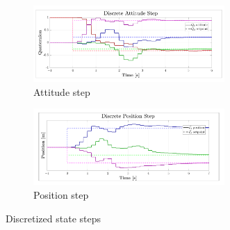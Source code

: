 \begin{figure}[hbtp]
\centering
\begin{subfigure}{\textwidth}
\centering
\includegraphics[width=0.8\textwidth]{graphs/discrete_attitude_step}
\vspace{-12pt}
\caption{Attitude step}
\end{subfigure}
\begin{subfigure}{\textwidth}
\vspace{-3pt}
\centering
\includegraphics[width=0.8\textwidth]{graphs/discrete_position_step}
\vspace{-12pt}
\caption{Position step}
\end{subfigure}
\vspace{-8pt}
\caption{Discretized state steps}
\label{fig:discrete_step}
\vspace{-12pt}
\end{figure}
\par